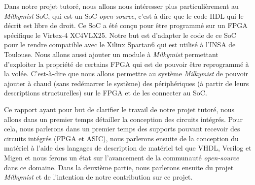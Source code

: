Dans notre projet tutoré, nous allons nous intéresser plus particulièrement au
\textit{Milkymist} SoC, qui est un SoC \textit{open-source}, c'est à dire que le code HDL qui le décrit
est libre de droit.  Ce SoC a été conçu pour être programmé sur un FPGA spécifique le
Virtex-4 XC4VLX25.  Notre but est d'adapter le code de ce SoC pour le rendre
compatible avec le Xilinx Spartan6 qui est utilisé à l'INSA de Toulouse.  Nous
allons aussi ajouter un module à \textit{Milkymist} permettant d'exploiter la propriété de
certains FPGA qui est de pouvoir être reprogrammé à la volée. C'est-à-dire que nous
allons permettre au système \textit{Milkymist} de pouvoir ajouter à chaud (sans redémarrer le
système) des périphériques (à partir de leurs descriptions structurelles) sur le FPGA
et de les connecter au SoC.

Ce rapport ayant pour but de clarifier le travail de notre projet tutoré, nous allons
dans un premier temps détailler la conception des circuits intégrés.  Pour cela, nous parlerons
dans un premier temps des supports pouvant recevoir des circuits intégrés (FPGA et ASIC),
nous parlerons ensuite de la conception du matériel à l'aide des langages de
description de matériel tel que VHDL, Verilog et Migen et nous ferons un état sur
l'avancement de la communauté \textit{open-source} dans ce domaine.  Dans la deuxième partie,
nous parlerons ensuite du projet \textit{Milkymist} et de l'intention de notre contribution
sur ce projet.
